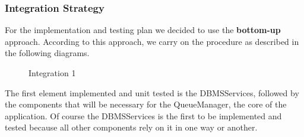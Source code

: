 \subsubsection{Integration Strategy}
For the implementation and testing plan we decided to use the \textbf{bottom-up} approach. According to this approach, we carry on the procedure as described in the following diagrams. 
\begin{figure}[H]
	\noindent
	\caption{Integration 1} %
\end{figure}
The first element implemented and unit tested is the DBMSServices, followed by the components that will be necessary for the QueueManager, the core of the application. Of course the DBMSServices is the first to be implemented and tested because all other components rely on it in one way or another.
